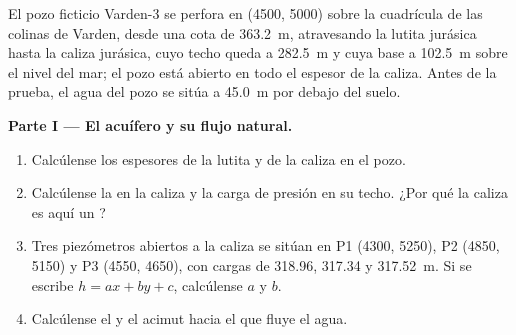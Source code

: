 \begin{problem}
\label{pb:b3:hydrogeology:1}
El pozo ficticio Varden-3 se perfora en (4500, 5000) sobre la cuadrícula de
las colinas de Varden, desde una cota de \qty{363.2}{m}, atravesando la lutita
jurásica hasta la caliza jurásica, cuyo techo queda a
\qty{282.5}{m} y cuya base a \qty{102.5}{m} sobre el nivel del mar; el pozo está abierto
en todo el espesor de la caliza. Antes de la prueba, el agua del pozo se sitúa
a \qty{45.0}{m} por debajo del suelo.

\medskip\noindent\textbf{Parte I --- El acuífero y su flujo natural.}
\begin{enumerate}
\item Calcúlense los espesores de la lutita y de la caliza en el pozo.
\item Calcúlense la  en la caliza y la carga de presión en su techo.
  ¿Por qué la caliza es aquí un ?
\item Tres piezómetros abiertos a la caliza se sitúan en P1 (4300, 5250), P2
  (4850, 5150) y P3 (4550, 4650), con cargas de 318.96, 317.34 y
  \qty{317.52}{m}. Si se escribe $h = ax + by + c$, calcúlense $a$ y $b$.
\item Calcúlense el  y el acimut hacia el que fluye el
  agua.
\end{enumerate}


\end{problem}

